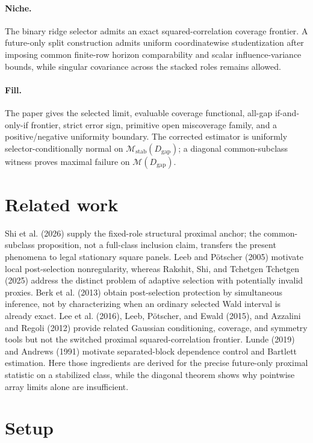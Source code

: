 \documentclass{article}
\begin{document}
\paragraph{Niche.} The binary ridge selector admits an exact squared-correlation coverage frontier. A future-only split construction admits uniform coordinatewise studentization after imposing common finite-row horizon comparability and scalar influence-variance bounds, while singular covariance across the stacked roles remains allowed.

\paragraph{Fill.} The paper gives the selected limit, evaluable coverage functional, all-gap if-and-only-if frontier, strict error sign, primitive open miscoverage family, and a positive/negative uniformity boundary. The corrected estimator is uniformly selector-conditionally normal on \(\mathcal M_{\mathrm{stab}}(D_{\mathrm{gap}})\); a diagonal common-subclass witness proves maximal failure on \(\mathcal M(D_{\mathrm{gap}})\).

\section{Related work}

Shi et al. (2026) supply the fixed-role structural proximal anchor; the common-subclass proposition, not a full-class inclusion claim, transfers the present phenomena to legal stationary square panels. Leeb and Pötscher (2005) motivate local post-selection nonregularity, whereas Rakshit, Shi, and Tchetgen Tchetgen (2025) address the distinct problem of adaptive selection with potentially invalid proxies. Berk et al. (2013) obtain post-selection protection by simultaneous inference, not by characterizing when an ordinary selected Wald interval is already exact. Lee et al. (2016), Leeb, Pötscher, and Ewald (2015), and Azzalini and Regoli (2012) provide related Gaussian conditioning, coverage, and symmetry tools but not the switched proximal squared-correlation frontier. Lunde (2019) and Andrews (1991) motivate separated-block dependence control and Bartlett estimation. Here those ingredients are derived for the precise future-only proximal statistic on a stabilized class, while the diagonal theorem shows why pointwise array limits alone are insufficient.

\section{Setup}
\end{document}
